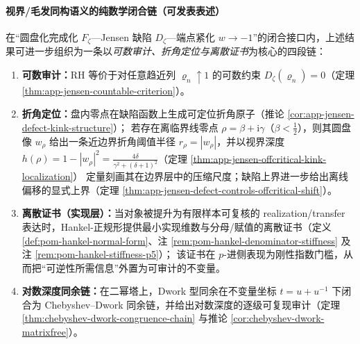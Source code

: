 \paragraph{视界/毛发同构语义的纯数学闭合链（可发表表述）}\label{par:app-jensen-horizon-hair-closed-chain}
在“圆盘化完成化 \(F_{\zeta}\)—Jensen 缺陷 \(D_{\zeta}\)—端点紧化 \(w\to-1\)”的闭合接口内，上述结果可进一步组织为一条以\emph{可数审计、折角定位与离散证书}为核心的四段链：
\begin{enumerate}
  \item \textbf{可数审计：}RH 等价于对任意趋近列 \(\varrho_n\uparrow 1\) 的可数约束 \(D_{\zeta}(\varrho_n)=0\)（定理 \ref{thm:app-jensen-countable-criterion}）。
  \item \textbf{折角定位：}盘内零点在缺陷函数上生成可定位折角原子（推论 \ref{cor:app-jensen-defect-kink-structure}）；
  若存在离临界线零点 \(\rho=\beta+\mathrm{i}\gamma\)（\(\beta<\tfrac12\)），则其圆盘像 \(w_{\rho}\) 给出一条近边界折角阈值半径 \(r_{\rho}=|w_{\rho}|\)，并以视界深度
  \(h(\rho)=1-|w_{\rho}|^{2}=\frac{4\delta}{\gamma^{2}+(\delta+1)^{2}}\)（定理 \ref{thm:app-jensen-offcritical-kink-localization}）
  定量刻画其在边界层中的压缩尺度；缺陷上界进一步给出离线偏移的显式上界（定理 \ref{thm:app-jensen-defect-controls-offcritical-shift}）。
  \item \textbf{离散证书（实现层）：}当对象被提升为有限样本可复核的 realization/transfer 表达时，Hankel-正规形提供最小实现维数与分母/赋值的离散证书（定义 \ref{def:pom-hankel-normal-form}、注 \ref{rem:pom-hankel-denominator-stiffness} 及注 \ref{rem:pom-hankel-stiffness-p5}）；
  该证书在 \(p\)-进侧表现为刚性指数门槛，从而把“可逆性所需信息”外置为可审计的不变量。
  \item \textbf{对数深度同余链：}在二幂塔上，Dwork 型同余在不变量坐标 \(t=u+u^{-1}\) 下闭合为 Chebyshev--Dwork 同余链，并给出对数深度的逐级可复现审计（定理 \ref{thm:chebyshev-dwork-congruence-chain} 与推论 \ref{cor:chebyshev-dwork-matrixfree}）。
\end{enumerate}
